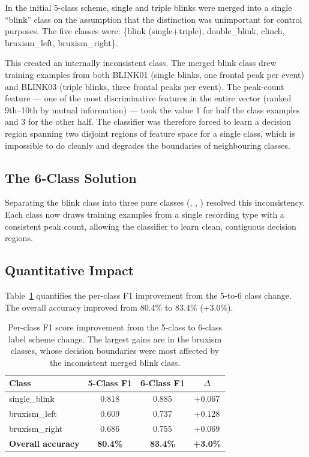 In the initial 5-class scheme, single and triple blinks were
merged into a single ``blink'' class on the assumption that the
distinction was unimportant for control purposes. The five classes
were: \{blink (single+triple), double\_blink, clinch,
bruxism\_left, bruxism\_right\}.

This created an internally inconsistent class. The merged blink
class drew training examples from both BLINK01 (single blinks,
one frontal peak per event) and BLINK03 (triple blinks, three
frontal peaks per event). The peak-count feature — one of the most
discriminative features in the entire vector (ranked 9th--10th by
mutual information) — took the value 1 for half the class examples
and 3 for the other half. The classifier was therefore forced to
learn a decision region spanning two disjoint regions of feature
space for a single class, which is impossible to do cleanly and
degrades the boundaries of neighbouring classes.

\subsection{The 6-Class Solution}

Separating the blink class into three pure classes
(, , )
resolved this inconsistency. Each class now draws training examples
from a single recording type with a consistent peak count, allowing
the classifier to learn clean, contiguous decision regions.

\subsection{Quantitative Impact}

Table~\ref{tab:label_impact} quantifies the per-class F1 improvement
from the 5-to-6 class change. The overall accuracy improved from
80.4\% to 83.4\% (+3.0\%).

\begin{table}[htbp]
\centering
\caption{Per-class F1 score improvement from the 5-class to
6-class label scheme change. The largest gains are in the
bruxism classes, whose decision boundaries were most affected
by the inconsistent merged blink class.}
\label{tab:label_impact}
\renewcommand{\arraystretch}{1.3}
\begin{tabular}{l c c c}
\toprule
\textbf{Class} & \textbf{5-Class F1} & \textbf{6-Class F1} &
\textbf{$\Delta$} \\
\midrule
single\_blink  & 0.818 & 0.885 & +0.067 \\
bruxism\_left  & 0.609 & 0.737 & +0.128 \\
bruxism\_right & 0.686 & 0.755 & +0.069 \\
\midrule
\textbf{Overall accuracy} & \textbf{80.4\%} & \textbf{83.4\%} &
\textbf{+3.0\%} \\
\bottomrule
\end{tabular}
\end{table}

